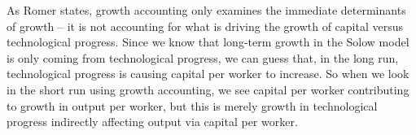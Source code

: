 \documentclass[12pt]{article}
\begin{document}
\newpage{}

As Romer states, growth accounting only examines the immediate determinants of growth -- it is not accounting for what is driving the growth of capital versus technological progress. Since we know that long-term growth in the Solow model is only coming from technological progress, we can guess that, in the long run, technological progress is causing capital per worker to increase. So when we look in the short run using growth accounting, we see capital per worker contributing to growth in output per worker, but this is merely growth in technological progress indirectly affecting output via capital per worker.



\newpage
\end{document}
